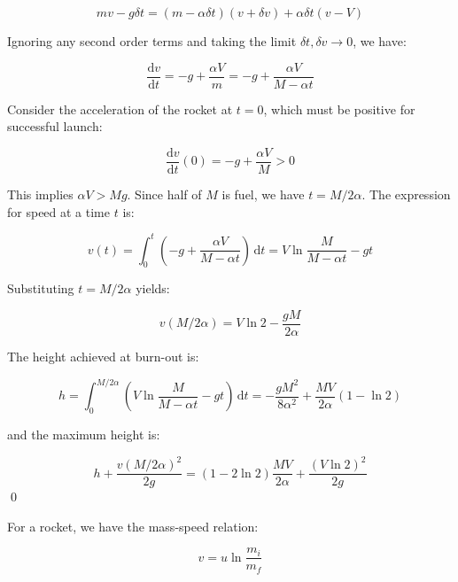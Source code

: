 \documentclass[12pt]{article}
\begin{document}
\begin{equation}
    mv - g \delta t = (m - \alpha \delta t)(v + \delta v) + \alpha \delta t (v - V)
\end{equation}

Ignoring any second order terms and taking the limit $\delta t, \delta v \to 0$, we have:

\begin{equation}
    \frac{\mathrm{d}v}{\mathrm{d}t} = -g + \frac{\alpha V}{m} = -g + \frac{\alpha V}{M - \alpha t}
\end{equation}

Consider the acceleration of the rocket at $t = 0$, which must be positive for successful launch:

\begin{equation}
    \frac{\mathrm{d}v}{\mathrm{d}t}(0) = -g + \frac{\alpha V}{M} > 0
\end{equation}

This implies $\alpha V > Mg$. Since half of $M$ is fuel, we have $t = M/2\alpha$. The expression for speed at a time $t$ is:

\begin{equation}
    v(t) = \int_{0}^{t} \left( -g + \frac{\alpha V}{M - \alpha t} \right) \, \mathrm{d}t = V \ln{\frac{M}{M - \alpha t}} - gt
\end{equation}

Substituting $t = M/2\alpha$ yields:

\begin{equation}
    v(M/2\alpha) = V \ln{2} - \frac{gM}{2\alpha}
\end{equation}

The height achieved at burn-out is:

\begin{equation}
    h = \int_{0}^{M/2\alpha} \left( V \ln{\frac{M}{M - \alpha t}} - gt \right) \, \mathrm{d}t = -\frac{gM^{2}}{8\alpha^{2}} + \frac{MV}{2\alpha} (1 - \ln{2})
\end{equation}

and the maximum height is:

\begin{equation}
    h + \frac{v(M/2\alpha)^{2}}{2g} = (1 - 2\ln{2}) \frac{MV}{2\alpha} + \frac{(V\ln{2})^{2}}{2g}
\end{equation}
\qed



For a rocket, we have the mass-speed relation:

\begin{equation}
    v = u \ln{\frac{m_{i}}{m_{f}}}
\end{equation}
\end{document}
